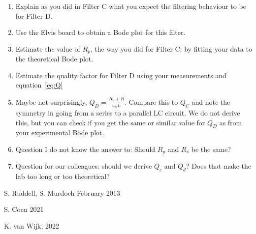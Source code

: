 \documentclass{article}
\begin{document}
\begin{enumerate}[resume]
\item Explain as you did in Filter C what you expect the filtering
  behaviour to be for Filter D.
  
  
\item Use the Elvis board to obtain a Bode plot for this filter.
\item Estimate the value of $R_p$, the way you did
  for Filter C: by fitting your data to the theoretical Bode plot.
  
\item Estimate the quality factor for Filter D using your measurements
  and equation~\ref{eq:Q}
\item Maybe not surprisingly, $Q_D = \frac{R_p+R}{\omega_0
    L}$. Compare this to $Q_C$ and note the symmetry in going from a
  series to a parallel LC circuit. We do not derive this, but you can
  check if you get the same or similar value for $Q_D$ as from your
  experimental Bode plot.
\item Question I do not know the answer to: Should $R_p$ and $R_s$ be
  the same?
\item Question for our colleagues: should we derive $Q_c$ and $Q_d$? Does
  that make the lab too long or too theoretical?
\end{enumerate}



S. Ruddell, S. Murdoch February 2013

S. Coen 2021

K. van Wijk, 2022
\end{document}
